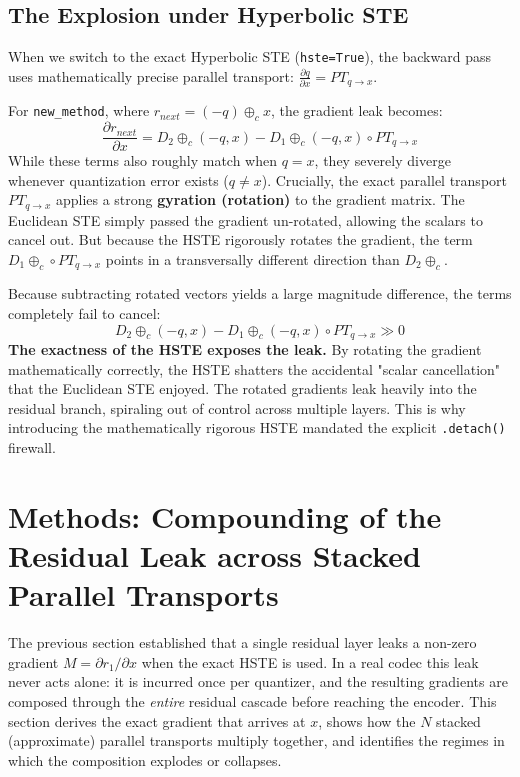 \documentclass{article}
\begin{document}
\subsection*{The Explosion under Hyperbolic STE}
When we switch to the exact Hyperbolic STE (\texttt{hste=True}), the backward pass uses mathematically precise parallel transport: $\frac{\partial q}{\partial x} = PT_{q \to x}$. 

For \texttt{new\_method}, where $r_{next} = (-q) \oplus_c x$, the gradient leak becomes:
\begin{equation}
    \frac{\partial r_{next}}{\partial x} = D_2 \oplus_c(-q, x) - D_1 \oplus_c(-q, x) \circ PT_{q \to x}
\end{equation}
While these terms also roughly match when $q = x$, they severely diverge whenever quantization error exists ($q \neq x$). 
Crucially, the exact parallel transport $PT_{q \to x}$ applies a strong \textbf{gyration (rotation)} to the gradient matrix. The Euclidean STE simply passed the gradient un-rotated, allowing the scalars to cancel out. But because the HSTE rigorously rotates the gradient, the term $D_1 \oplus_c \circ PT_{q \to x}$ points in a transversally different direction than $D_2 \oplus_c$. 

Because subtracting rotated vectors yields a large magnitude difference, the terms completely fail to cancel:
\begin{equation}
    D_2 \oplus_c(-q, x) - D_1 \oplus_c(-q, x) \circ PT_{q \to x} \gg 0
\end{equation}
\textbf{The exactness of the HSTE exposes the leak.} By rotating the gradient mathematically correctly, the HSTE shatters the accidental "scalar cancellation" that the Euclidean STE enjoyed. The rotated gradients leak heavily into the residual branch, spiraling out of control across multiple layers. This is why introducing the mathematically rigorous HSTE mandated the explicit \texttt{.detach()} firewall.

\section*{Methods: Compounding of the Residual Leak across Stacked Parallel Transports}

The previous section established that a single residual layer leaks a non-zero gradient $M = \partial r_1/\partial x$ when the exact HSTE is used. In a real codec this leak never acts alone: it is incurred once per quantizer, and the resulting gradients are composed through the \emph{entire} residual cascade before reaching the encoder. This section derives the exact gradient that arrives at $x$, shows how the $N$ stacked (approximate) parallel transports multiply together, and identifies the regimes in which the composition explodes or collapses.
\end{document}
